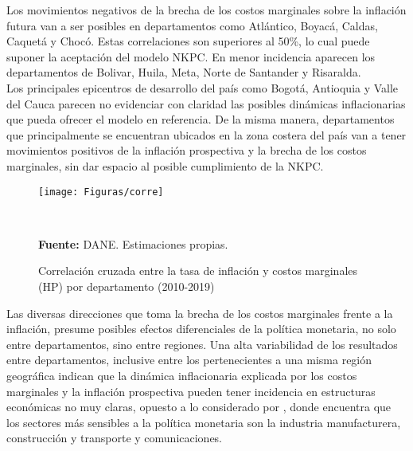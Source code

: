 Los movimientos negativos de la brecha de los costos marginales sobre la inflación futura van a ser posibles en  departamentos  como Atlántico, Boyacá,  Caldas, Caquetá y Chocó. Estas correlaciones son superiores al 50\%, lo cual puede suponer la aceptación del modelo NKPC. En menor incidencia aparecen los departamentos de Bolivar, Huila, Meta, Norte de Santander y Risaralda. \\

Los principales epicentros de desarrollo del país como Bogotá, Antioquia y Valle del Cauca parecen no evidenciar con claridad las posibles dinámicas inflacionarias que pueda ofrecer el modelo en referencia. De la misma manera, departamentos que principalmente se encuentran ubicados en la zona costera del país van a tener movimientos positivos de la inflación prospectiva y la brecha de los costos marginales, sin dar espacio al posible cumplimiento de la NKPC.\\

\begin{figure}[H]
  	\centering 		
  	\caption{Correlación cruzada entre la tasa de inflación y costos marginales (HP) por departamento (2010-2019)}
	\texttt{[image: Figuras/corre]}
	\raggedright %
		\label{cor24}\\
  \raggedright  \scriptsize \textbf{Fuente:} DANE. Estimaciones propias.	
	\end{figure}

Las diversas direcciones que toma la brecha de los costos marginales frente a la inflación, presume posibles efectos diferenciales de la política monetaria, no solo entre departamentos, sino entre regiones. Una alta variabilidad de los resultados entre departamentos, inclusive entre los pertenecientes a una misma región geográfica indican que la dinámica inflacionaria explicada por los costos marginales y la inflación prospectiva pueden tener incidencia en estructuras económicas no muy claras, opuesto a lo considerado por \cite{quintero2019impactos}, donde encuentra que los sectores más sensibles a la política monetaria son la industria manufacturera, construcción y transporte y comunicaciones.

